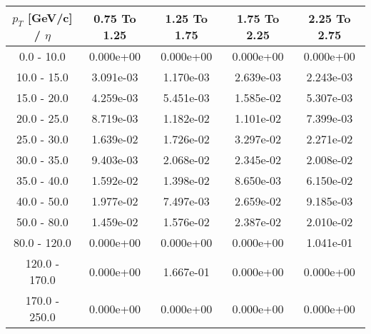 \begin{tabular}{|c|c|c|c|c|}\hline 
$p_T$ [GeV/c] / $\eta$  & 0.75 To 1.25 & 1.25 To 1.75 & 1.75 To 2.25 & 2.25 To 2.75 \\ 
 \hline 
0.0 - 10.0 & 0.000e+00 & 0.000e+00 & 0.000e+00 & 0.000e+00 \\ 
10.0 - 15.0 & 3.091e-03 & 1.170e-03 & 2.639e-03 & 2.243e-03 \\ 
15.0 - 20.0 & 4.259e-03 & 5.451e-03 & 1.585e-02 & 5.307e-03 \\ 
20.0 - 25.0 & 8.719e-03 & 1.182e-02 & 1.101e-02 & 7.399e-03 \\ 
25.0 - 30.0 & 1.639e-02 & 1.726e-02 & 3.297e-02 & 2.271e-02 \\ 
30.0 - 35.0 & 9.403e-03 & 2.068e-02 & 2.345e-02 & 2.008e-02 \\ 
35.0 - 40.0 & 1.592e-02 & 1.398e-02 & 8.650e-03 & 6.150e-02 \\ 
40.0 - 50.0 & 1.977e-02 & 7.497e-03 & 2.659e-02 & 9.185e-03 \\ 
50.0 - 80.0 & 1.459e-02 & 1.576e-02 & 2.387e-02 & 2.010e-02 \\ 
80.0 - 120.0 & 0.000e+00 & 0.000e+00 & 0.000e+00 & 1.041e-01 \\ 
120.0 - 170.0 & 0.000e+00 & 1.667e-01 & 0.000e+00 & 0.000e+00 \\ 
170.0 - 250.0 & 0.000e+00 & 0.000e+00 & 0.000e+00 & 0.000e+00 \\ 
 \hline 
\end{tabular} 
